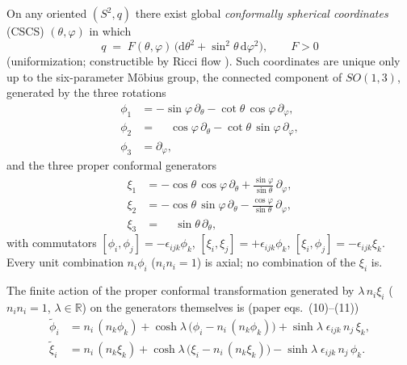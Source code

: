 \documentclass[11pt]{article}
\newcommand{\dd}{\mathrm{d}}
\begin{document}
On any oriented $(S^2,q)$ there exist global \emph{conformally spherical
coordinates} (CSCS) $(\theta,\varphi)$ in which
\begin{equation}
  q \;=\; F(\theta,\varphi)\,\bigl(\dd\theta^2 + \sin^2\!\theta\,
  \dd\varphi^2\bigr),
  \qquad F>0
  \label{eq:cscs}
\end{equation}
(uniformization; constructible by Ricci flow
\cite{hamilton1988,chow1991}).  Such coordinates are unique only up to the
six-parameter M\"obius group, the connected component of $SO(1,3)$, generated
by the three rotations
\begin{equation}
  \begin{aligned}
    \phi_1 &= -\sin\varphi\,\partial_\theta
              - \cot\theta\,\cos\varphi\,\partial_\varphi,\\
    \phi_2 &= \phantom{-}\cos\varphi\,\partial_\theta
              - \cot\theta\,\sin\varphi\,\partial_\varphi,\\
    \phi_3 &= \partial_\varphi,
  \end{aligned}
  \label{eq:phigen}
\end{equation}
and the three proper conformal generators
\begin{equation}
  \begin{aligned}
    \xi_1 &= -\cos\theta\,\cos\varphi\,\partial_\theta
             + \frac{\sin\varphi}{\sin\theta}\,\partial_\varphi,\\
    \xi_2 &= -\cos\theta\,\sin\varphi\,\partial_\theta
             - \frac{\cos\varphi}{\sin\theta}\,\partial_\varphi,\\
    \xi_3 &= \phantom{-}\sin\theta\,\partial_\theta,
  \end{aligned}
  \label{eq:xigen}
\end{equation}
with commutators $[\phi_i,\phi_j] = -\epsilon_{ijk}\phi_k$,
$[\xi_i,\xi_j] = +\epsilon_{ijk}\phi_k$,
$[\xi_i,\phi_j] = -\epsilon_{ijk}\xi_k$.
Every unit combination $n_i\phi_i$ ($n_in_i=1$) is axial; no combination of
the $\xi_i$ is.

The finite action of the proper conformal transformation generated by
$\lambda\, n_i \xi_i$ ($n_i n_i = 1$, $\lambda\in\mathbb{R}$) on the
generators themselves is (paper eqs.~(10)--(11))
\begin{equation}
  \begin{aligned}
    \tilde\phi_i &= n_i\,(n_k\phi_k)
      + \cosh\lambda\,\bigl(\phi_i - n_i\,(n_k\phi_k)\bigr)
      + \sinh\lambda\;\epsilon_{ijk}\,n_j\,\xi_k,\\
    \tilde\xi_i &= n_i\,(n_k\xi_k)
      + \cosh\lambda\,\bigl(\xi_i - n_i\,(n_k\xi_k)\bigr)
      - \sinh\lambda\;\epsilon_{ijk}\,n_j\,\phi_k .
  \end{aligned}
  \label{eq:finitegen}
\end{equation}
\end{document}
